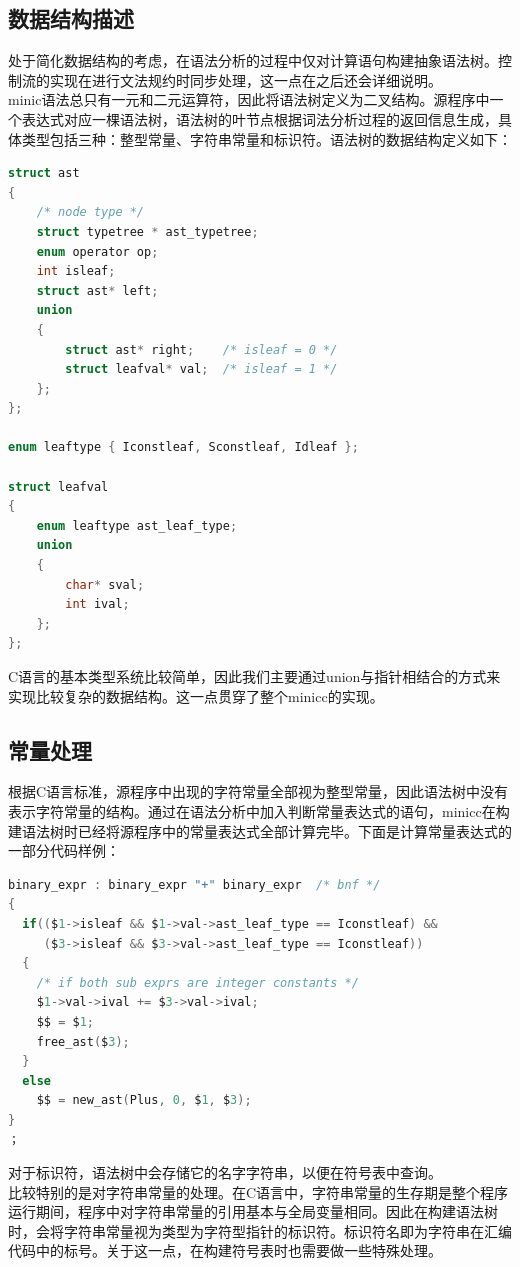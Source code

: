 \documentclass[12pt,a4paper,Flow]{report}
\begin{document}
\subsection{数据结构描述}
处于简化数据结构的考虑，在语法分析的过程中仅对计算语句构建抽象语法树。控制流的实现在进行文法规约时同步处理，这一点在之后还会详细说明。\\
\indent minic语法总只有一元和二元运算符，因此将语法树定义为二叉结构。源程序中一个表达式对应一棵语法树，语法树的叶节点根据词法分析过程的返回信息生成，具体类型包括三种：整型常量、字符串常量和标识符。语法树的数据结构定义如下：
\begin{lstlisting}[language=c]
struct ast
{
    /* node type */
    struct typetree * ast_typetree;
    enum operator op;
    int isleaf;
    struct ast* left;
    union
    {
        struct ast* right;    /* isleaf = 0 */
        struct leafval* val;  /* isleaf = 1 */
    };
};

enum leaftype { Iconstleaf, Sconstleaf, Idleaf };

struct leafval
{
    enum leaftype ast_leaf_type;
    union
    {
        char* sval;
        int ival;
    };
};
\end{lstlisting}
C语言的基本类型系统比较简单，因此我们主要通过union与指针相结合的方式来实现比较复杂的数据结构。这一点贯穿了整个minicc的实现。
\subsection{常量处理}
根据C语言标准，源程序中出现的字符常量全部视为整型常量，因此语法树中没有表示字符常量的结构。通过在语法分析中加入判断常量表达式的语句，minicc在构建语法树时已经将源程序中的常量表达式全部计算完毕。下面是计算常量表达式的一部分代码样例：\\
\begin{lstlisting}[language=c]
binary_expr : binary_expr "+" binary_expr  /* bnf */
{
  if(($1->isleaf && $1->val->ast_leaf_type == Iconstleaf) &&
     ($3->isleaf && $3->val->ast_leaf_type == Iconstleaf))
  {
    /* if both sub exprs are integer constants */
    $1->val->ival += $3->val->ival;
    $$ = $1;
    free_ast($3);
  }
  else
    $$ = new_ast(Plus, 0, $1, $3);
}
；
\end{lstlisting}
\indent 对于标识符，语法树中会存储它的名字字符串，以便在符号表中查询。\\
\indent 比较特别的是对字符串常量的处理。在C语言中，字符串常量的生存期是整个程序运行期间，程序中对字符串常量的引用基本与全局变量相同。因此在构建语法树时，会将字符串常量视为类型为字符型指针的标识符。标识符名即为字符串在汇编代码中的标号。关于这一点，在构建符号表时也需要做一些特殊处理。\\
\end{document}
